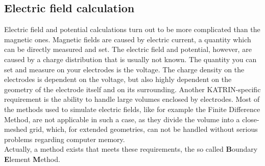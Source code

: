 \subsection{Electric field calculation}
\label{ch:Methods for electric and magnetic field-calculation:sec:Electric field calculation}
  Electric field and potential calculations turn out to be more complicated than the magnetic ones. Magnetic fields are caused by electric current, a quantity which can be directly measured and set. The electric field and potential, however,  are caused by a charge distribution that is usually not known. The quantity you can set and measure on your electrodes is the voltage. The charge density on the electrodes is dependent on the voltage, but also highly dependent on the geometry of the electrode itself and on its surrounding. Another KATRIN-specific requirement is the ability to handle large volumes enclosed by electrodes. Most of the methods used to simulate electric fields, like for example the Finite Difference Method, are not applicable in such a case, as they divide the volume into a close-meshed grid, which, for extended geometries, can not be handled without serious problems regarding computer memory. \\
  Actually, a method exists that meets these requirements, the so called \textbf{B}oundary \textbf{E}lement \textbf{M}ethod.
